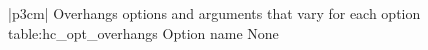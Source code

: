 \begin{customLongTable}{ |p{3cm}| }
{Overhangs options and arguments that vary for each option} {table:hc_opt_overhangs}
{Option name}
None \\
\end{customLongTable}
